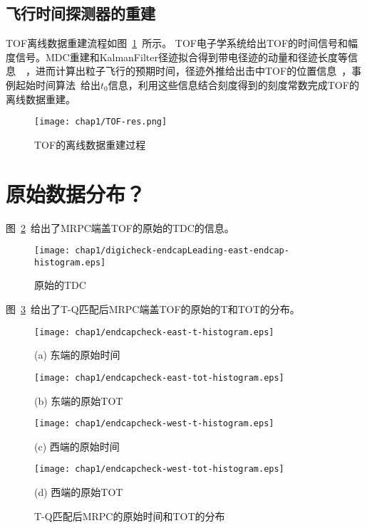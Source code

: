\subsection{飞行时间探测器的重建}
TOF离线数据重建流程如图~\ref{fig:TOF-res}~所示。
TOF电子学系统给出TOF的时间信号和幅度信号。MDC重建和KalmanFilter径迹拟合得到带电径迹的动量和径迹长度等信息~\cite{wulh2007}~\cite{wangjk2009}，进而计算出粒子飞行的预期时间，径迹外推给出击中TOF的位置信息~\cite{wangll:2014}，事例起始时间算法~\cite{Maxiang:2008}给出$t_{0}$信息，利用这些信息结合刻度得到的刻度常数完成TOF的离线数据重建。
\begin{figure}[!h]
  \centering
  \texttt{[image: chap1/TOF-res.png]}
  \caption{TOF的离线数据重建过程}
  \label{fig:TOF-res}
\end{figure}

\section{原始数据分布？}
图~\ref{fig:digicheck-endcapLeading-east-endcap-histogram}~给出了MRPC端盖TOF的原始的TDC的信息。
\begin{figure}[!h]
  \centering
  \texttt{[image: chap1/digicheck-endcapLeading-east-endcap-histogram.eps]}
  \caption{原始的TDC}
  \label{fig:digicheck-endcapLeading-east-endcap-histogram}
\end{figure}

图~\ref{fig:T and Q}~给出了T-Q匹配后MRPC端盖TOF的原始的T和TOT的分布。
\begin{figure}[!h]
\begin{minipage}{0.48\linewidth}
  \centerline{ \centering \texttt{[image: chap1/endcapcheck-east-t-histogram.eps]}}
  \centerline{(a) 东端的原始时间}
  \centerline{\label{fig:endcapcheck-east-t-histogram}}
\end{minipage}
\begin{minipage}{0.48\linewidth}
  \centerline{ \centering \texttt{[image: chap1/endcapcheck-east-tot-histogram.eps]}}
  \centerline{(b) 东端的原始TOT}
  \centerline{\label{fig:endcapcheck-east-tot-histogram}}
\end{minipage}
\vfill
\begin{minipage}{0.48\linewidth}
  \centerline{ \centering  \texttt{[image: chap1/endcapcheck-west-t-histogram.eps]}}
  \centerline{(c) 西端的原始时间}
  \centerline{\label{fig:endcapcheck-west-t-histogram}}
\end{minipage}
\begin{minipage}{0.48\linewidth}
  \centerline{ \centering \texttt{[image: chap1/endcapcheck-west-tot-histogram.eps]}}
  \centerline{(d) 西端的原始TOT}
  \centerline{\label{fig:endcapcheck-west-tot-histogram}}
\end{minipage}
\caption{T-Q匹配后MRPC的原始时间和TOT的分布}
\label{fig:T and Q}
\end{figure}

